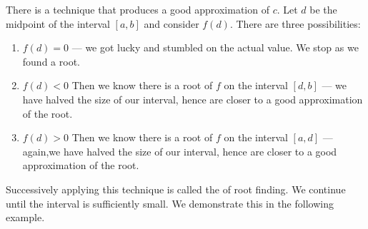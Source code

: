 There is a technique that produces a good approximation of $c$. Let $d$ be the midpoint of the interval $[a,b]$ and consider $f(d)$. There are three possibilities:
\begin{enumerate}
	\item	$f(d) = 0$ --- we got lucky and stumbled on the actual value. We stop as we found a root.
	\item	$f(d) <0$ Then we know there is a root of $f$ on the interval $[d,b]$ --- we have halved the size of our interval, hence are closer to a good approximation of the root.
	\item	$f(d) >0$ Then we know there is a root of $f$ on the interval $[a,d]$ --- again,we have halved the size of our interval, hence are closer to a good approximation of the root.
\end{enumerate}

Successively applying this technique is called the   of root finding. We continue until the interval is sufficiently small. We demonstrate this in the following example.


